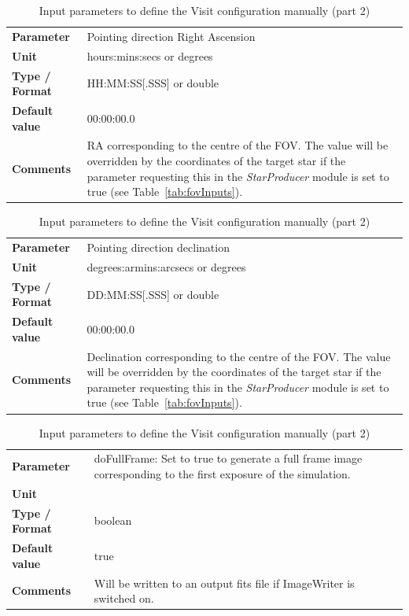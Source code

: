 \documentclass[11pt]{article}      %
\def\HCode#1{}
\def\htmlanchor#1{\HCode{<a id="#1"></a>}}
\begin{document}
\begin{table}[hb]
  \caption{Input parameters to define the Visit configuration manually (part 2)}

  \htmlanchor{pointingRA}
  \begin{tabular}{| l | p{13cm} |}
    \hline 
    {\bf Parameter} & Pointing direction Right Ascension \\
    {\bf Unit} & hours:mins:secs or degrees\\
    {\bf Type / Format} & HH:MM:SS[.SSS] or double\\
    {\bf Default value} & 00:00:00.0\\
    {\bf Comments} & RA corresponding to the centre of the FOV. The value will be overridden by the coordinates of the target star if the parameter requesting this in the {\it StarProducer} module is set to true (see Table~\ref{tab:fovInputs}).\\
    \hline
  \end{tabular}
  \bigskip

  \htmlanchor{pointingDec}
  \begin{tabular}{| l | p{13cm} |}
    \hline 
    {\bf Parameter} & Pointing direction declination\\
    {\bf Unit} & degrees:armins:arcsecs or degrees\\
    {\bf Type / Format} & DD:MM:SS[.SSS] or double\\
    {\bf Default value} & 00:00:00.0\\
    {\bf Comments} & Declination corresponding to the centre of the FOV. The value will be overridden by the coordinates of the target star if the parameter requesting this in the {\it StarProducer} module is set to true (see Table~\ref{tab:fovInputs}).\\
    \hline
  \end{tabular}
  \bigskip

  \htmlanchor{doFullFrame}
  \begin{tabular}{| l | p{13cm} |}
    \hline 
    {\bf Parameter} & doFullFrame: Set to true to generate a full frame image corresponding to the first exposure of the simulation.\\
    {\bf Unit} & \\
    {\bf Type / Format} & boolean\\
    {\bf Default value} & true\\
    {\bf Comments} &  Will be written to an output fits file if ImageWriter is switched on.\\
    \hline
  \end{tabular}

  \label{tab:time3}
\end{table}
\end{document}
